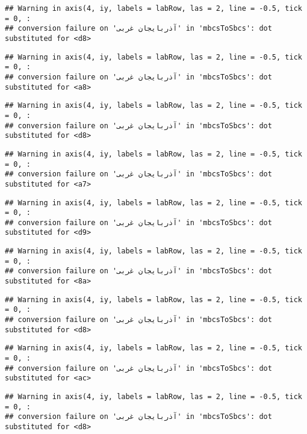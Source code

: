 \documentclass[
]{article}
\begin{document}
\begin{verbatim}
## Warning in axis(4, iy, labels = labRow, las = 2, line = -0.5, tick = 0, :
## conversion failure on 'آذربايجان غربی' in 'mbcsToSbcs': dot substituted for <d8>
\end{verbatim}

\begin{verbatim}
## Warning in axis(4, iy, labels = labRow, las = 2, line = -0.5, tick = 0, :
## conversion failure on 'آذربايجان غربی' in 'mbcsToSbcs': dot substituted for <a8>
\end{verbatim}

\begin{verbatim}
## Warning in axis(4, iy, labels = labRow, las = 2, line = -0.5, tick = 0, :
## conversion failure on 'آذربايجان غربی' in 'mbcsToSbcs': dot substituted for <d8>
\end{verbatim}

\begin{verbatim}
## Warning in axis(4, iy, labels = labRow, las = 2, line = -0.5, tick = 0, :
## conversion failure on 'آذربايجان غربی' in 'mbcsToSbcs': dot substituted for <a7>
\end{verbatim}

\begin{verbatim}
## Warning in axis(4, iy, labels = labRow, las = 2, line = -0.5, tick = 0, :
## conversion failure on 'آذربايجان غربی' in 'mbcsToSbcs': dot substituted for <d9>
\end{verbatim}

\begin{verbatim}
## Warning in axis(4, iy, labels = labRow, las = 2, line = -0.5, tick = 0, :
## conversion failure on 'آذربايجان غربی' in 'mbcsToSbcs': dot substituted for <8a>
\end{verbatim}

\begin{verbatim}
## Warning in axis(4, iy, labels = labRow, las = 2, line = -0.5, tick = 0, :
## conversion failure on 'آذربايجان غربی' in 'mbcsToSbcs': dot substituted for <d8>
\end{verbatim}

\begin{verbatim}
## Warning in axis(4, iy, labels = labRow, las = 2, line = -0.5, tick = 0, :
## conversion failure on 'آذربايجان غربی' in 'mbcsToSbcs': dot substituted for <ac>
\end{verbatim}

\begin{verbatim}
## Warning in axis(4, iy, labels = labRow, las = 2, line = -0.5, tick = 0, :
## conversion failure on 'آذربايجان غربی' in 'mbcsToSbcs': dot substituted for <d8>
\end{verbatim}
\end{document}
